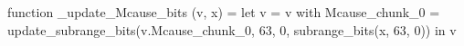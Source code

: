 function _update_Mcause_bits (v, x) = let v = { v with Mcause_chunk_0 = update_subrange_bits(v.Mcause_chunk_0, 63, 0, subrange_bits(x, 63, 0)) } in
  v
